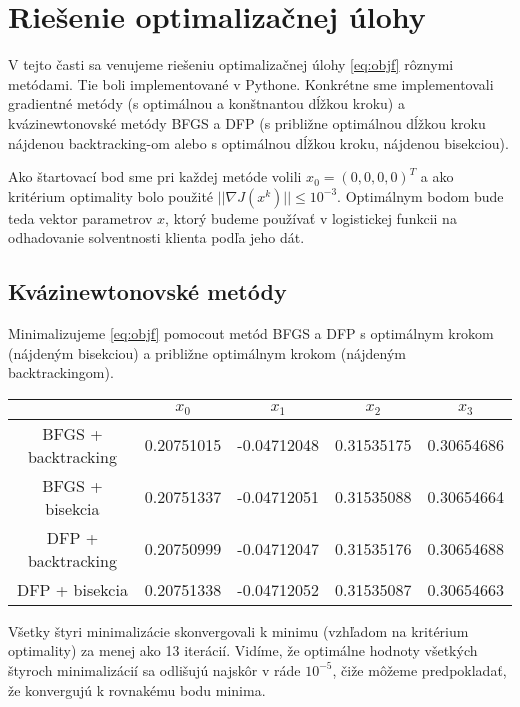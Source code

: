 \documentclass[report.tex]{subfiles}
\begin{document}
   

\section{Riešenie optimalizačnej úlohy}\label{sec:CD}

V tejto časti sa venujeme riešeniu optimalizačnej úlohy \ref{eq:objf} rôznymi metódami. Tie boli implementované v Pythone. Konkrétne sme implementovali gradientné metódy (s optimálnou a konštnantou dĺžkou kroku) a kvázinewtonovské metódy BFGS a DFP (s približne optimálnou dĺžkou kroku nájdenou backtracking-om alebo s optimálnou dĺžkou kroku, nájdenou bisekciou). 

Ako štartovací bod sme pri každej metóde volili $x_0 = (0,0,0,0)^T$ a ako kritérium optimality bolo použité $||\nabla J(x^k)|| \leq 10^{-3}$. Optimálnym bodom bude teda vektor parametrov $x$, ktorý budeme používať v logistickej funkcii na odhadovanie solventnosti klienta podľa jeho dát.
	

\subsection{Kvázinewtonovské metódy}

Minimalizujeme \ref{eq:objf} pomocout metód BFGS a DFP s optimálnym krokom (nájdeným bisekciou) a približne optimálnym krokom (nájdeným backtrackingom).

\begin{center}
	\small
	\begin{tabular}{| c | c  c  c  c |}
		\hline
		 & $x_0$ & $x_1$ & $x_2$ & $x_3$ \\
		\hline
		BFGS + backtracking & 0.20751015 & -0.04712048 & 0.31535175 & 0.30654686 \\
		BFGS + bisekcia & 0.20751337 & -0.04712051 & 0.31535088 & 0.30654664 \\
		DFP + backtracking & 0.20750999 & -0.04712047 & 0.31535176 & 0.30654688 \\
		DFP + bisekcia & 0.20751338 & -0.04712052 & 0.31535087 & 0.30654663 \\
		\hline
	\end{tabular}
\end{center}

Všetky štyri minimalizácie skonvergovali k minimu (vzhľadom na kritérium optimality) za menej ako 13 iterácií. Vidíme, že optimálne hodnoty všetkých štyroch minimalizácií sa odlišujú najskôr v ráde $10^{-5}$, čiže môžeme predpokladať, že konvergujú k rovnakému bodu minima.
\end{document}
